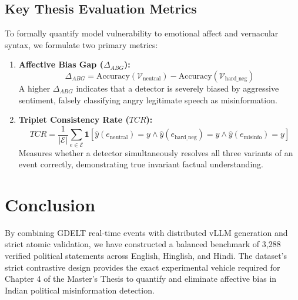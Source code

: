 \documentclass[11pt,a4paper]{article}
\begin{document}
\subsection{Key Thesis Evaluation Metrics}
To formally quantify model vulnerability to emotional affect and vernacular syntax, we formulate two primary metrics:
\begin{enumerate}
    \item \textbf{Affective Bias Gap ($\Delta_{ABG}$):}
    \begin{equation}
    \Delta_{ABG} = \text{Accuracy}(\mathcal{V}_{\text{neutral}}) - \text{Accuracy}(\mathcal{V}_{\text{hard\_neg}})
    \end{equation}
    A higher $\Delta_{ABG}$ indicates that a detector is severely biased by aggressive sentiment, falsely classifying angry legitimate speech as misinformation.
    
    \item \textbf{Triplet Consistency Rate ($TCR$):}
    \begin{equation}
    TCR = \frac{1}{|\mathcal{E}|} \sum_{e \in \mathcal{E}} \mathbf{1}\left[\hat{y}(e_{\text{neutral}}) = y \wedge \hat{y}(e_{\text{hard\_neg}}) = y \wedge \hat{y}(e_{\text{misinfo}}) = y\right]
    \end{equation}
    Measures whether a detector simultaneously resolves all three variants of an event correctly, demonstrating true invariant factual understanding.
\end{enumerate}

\section{Conclusion}
By combining GDELT real-time events with distributed vLLM generation and strict atomic validation, we have constructed a balanced benchmark of 3,288 verified political statements across English, Hinglish, and Hindi. The dataset's strict contrastive design provides the exact experimental vehicle required for Chapter 4 of the Master's Thesis to quantify and eliminate affective bias in Indian political misinformation detection.
\end{document}
